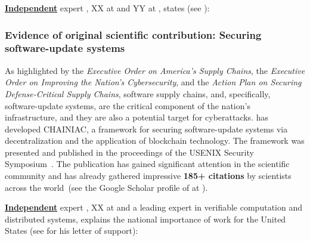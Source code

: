 \textbf{\uline{Independent}} expert \eee, XX at \purpleinc and YY at \cyanuni, states (see
):


\subsubsection{Evidence of original scientific contribution: Securing software-update systems}
\label{sec:chainiac}

As highlighted by the \emph{Executive Order on America's Supply Chains}, the
\emph{Executive Order on Improving the Nation’s Cybersecurity}, and the
\emph{Action Plan on Securing Defense-Critical Supply Chains},
software supply chains, and, specifically, software-update systems, are the
critical component of the nation's infrastructure, and they are also a potential
target for cyberattacks.
\dr has developed CHAINIAC, a framework for securing software-update
systems via decentralization and the application of blockchain technology.
The framework was presented and published in the proceedings of the USENIX
Security Symposium~\cite{chainiac}.
The publication has gained significant attention in the scientific community and
has already gathered impressive \textbf{185+ citations} by scientists
across the world~(see the Google Scholar profile of \dr at ).

\textbf{\uline{Independent}} expert \ddd, XX at \yellowuni and a leading expert
in verifiable computation and distributed systems, explains the national
importance of \drs work for the United States (see  for
his letter of support):

